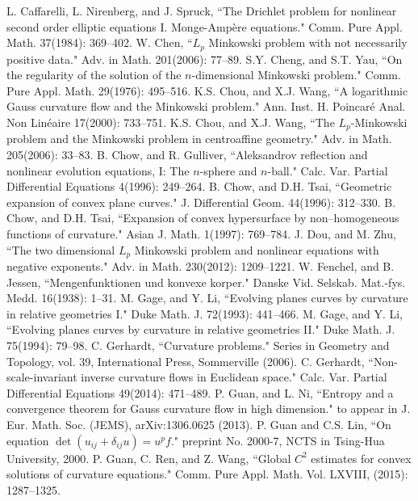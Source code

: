 \documentclass{amsart}
\theoremstyle{definition}
\theoremstyle{remark}
\numberwithin{equation}{section}
\begin{document}
\begin{thebibliography}{10}
  L. Caffarelli, L. Nirenberg, and J. Spruck, ``The Drichlet problem for nonlinear second order elliptic equations I. Monge-Amp\`{e}re equations." Comm. Pure Appl. Math. 37(1984): 369--402.
  W. Chen, ``$L_p$ Minkowski problem with not necessarily positive data." Adv. in Math. 201(2006): 77--89.
 S.Y. Cheng, and S.T. Yau, ``On the regularity of the solution of the $n$-dimensional Minkowski problem." Comm. Pure Appl. Math. 29(1976): 495--516.
 K.S. Chou, and X.J. Wang, ``A logarithmic Gauss curvature flow and the Minkowski problem." Ann. Inst. H. Poincar\'{e} Anal. Non Lin\'{e}aire 17(2000): 733--751.
 K.S. Chou, and X.J. Wang, ``The $L_p$-Minkowski problem and the Minkowski problem in centroaffine geometry." Adv. in Math. 205(2006): 33--83.
 B. Chow, and R. Gulliver, ``Aleksandrov reflection and nonlinear evolution equations, I: The $n$-sphere and $n$-ball." Calc. Var. Partial Differential Equations 4(1996): 249--264.
 B. Chow, and D.H. Tsai, ``Geometric expansion of convex plane curves." J. Differential Geom. 44(1996): 312--330.
 B. Chow, and D.H. Tsai, ``Expansion of convex hypersurface by non--homogeneous functions of curvature." Asian J. Math. 1(1997): 769--784.
J. Dou, and  M. Zhu, ``The two dimensional $L_p$ Minkowski problem and nonlinear equations with negative exponents." Adv. in Math. 230(2012): 1209--1221.
 W. Fenchel, and B. Jessen, ``Mengenfunktionen und konvexe korper." Danske Vid. Selskab. Mat.-fys. Medd. 16(1938): 1--31.
 M. Gage, and Y. Li, ``Evolving planes curves by curvature in relative geometries I." Duke Math. J. 72(1993): 441--466.
 M. Gage, and Y. Li,  ``Evolving planes curves by curvature in relative geometries II." Duke Math. J. 75(1994): 79--98.
 C. Gerhardt, ``Curvature problems." Series in Geometry and Topology, vol. 39, International Press, Sommerville (2006).
 C. Gerhardt, ``Non-scale-invariant inverse curvature flows in Euclidean space." Calc. Var. Partial Differential Equations 49(2014): 471--489.
 P. Guan, and L. Ni, ``Entropy and a convergence theorem for Gauss curvature flow in high dimension."  to appear in J. Eur. Math. Soc. (JEMS), arXiv:1306.0625 (2013).
  P. Guan and C.S. Lin, ``On equation $\det(u_{ij} + \delta_{ij}u) = u^p f$." preprint No. 2000-7, NCTS in Tsing-Hua University, 2000.
P. Guan, C. Ren, and Z. Wang, ``Global $C^2$ estimates for convex solutions of curvature equations." Comm. Pure Appl. Math. Vol. LXVIII, (2015): 1287--1325.

\end{thebibliography}
\end{document}
